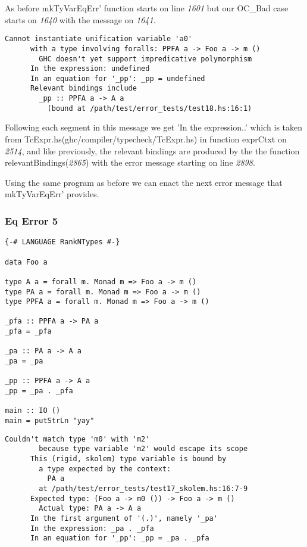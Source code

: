 \documentclass[a4paper]{article}
\begin{document}
As before mkTyVarEqErr' function starts on line \textit{1601} but our OC\_Bad case starts on \textit{1640} with the message on \textit{1641}.

\begin{lstlisting}[label={lst: T10.0.2}, numbers=none, caption={Error}]
Cannot instantiate unification variable 'a0'
      with a type involving foralls: PPFA a -> Foo a -> m ()
        GHC doesn't yet support impredicative polymorphism
      In the expression: undefined
      In an equation for '_pp': _pp = undefined
      Relevant bindings include
        _pp :: PPFA a -> A a
          (bound at /path/test/error_tests/test18.hs:16:1)
\end{lstlisting}

Following each segment in this message we get 'In the expression..' which is taken from TcExpr.hs(ghc/compiler/typecheck/TcExpr.hs) in function exprCtxt on \textit{2514}, and like previously, the relevant bindings are produced by the the function relevantBindings(\textit{2865}) with the error message starting on line \textit{2898}.

Using the same program as before we can enact the next error message that mkTyVarEqErr' provides.

\subsubsection{Eq Error 5}

\begin{lstlisting}[label={lst: T11.0}, numbers=none, caption={Example Program \cite{ex10}}]
{-# LANGUAGE RankNTypes #-}

data Foo a

type A a = forall m. Monad m => Foo a -> m ()
type PA a = forall m. Monad m => Foo a -> m ()
type PPFA a = forall m. Monad m => Foo a -> m ()

_pfa :: PPFA a -> PA a
_pfa = _pfa

_pa :: PA a -> A a
_pa = _pa

_pp :: PPFA a -> A a
_pp = _pa . _pfa

main :: IO ()
main = putStrLn "yay"
\end{lstlisting}

\begin{lstlisting}[label={lst: T11.0.2}, numbers=none, caption={Error}]
Couldn't match type 'm0' with 'm2'
        because type variable 'm2' would escape its scope
      This (rigid, skolem) type variable is bound by
        a type expected by the context:
          PA a
        at /path/test/error_tests/test17_skolem.hs:16:7-9
      Expected type: (Foo a -> m0 ()) -> Foo a -> m ()
        Actual type: PA a -> A a
      In the first argument of '(.)', namely '_pa'
      In the expression: _pa . _pfa
      In an equation for '_pp': _pp = _pa . _pfa
\end{lstlisting}
\end{document}
